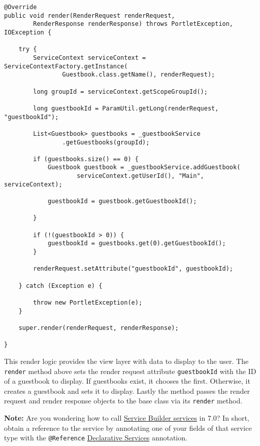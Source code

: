 \begin{verbatim}
@Override
public void render(RenderRequest renderRequest,
        RenderResponse renderResponse) throws PortletException, IOException {

    try {
        ServiceContext serviceContext = ServiceContextFactory.getInstance(
                Guestbook.class.getName(), renderRequest);

        long groupId = serviceContext.getScopeGroupId();

        long guestbookId = ParamUtil.getLong(renderRequest, "guestbookId");

        List<Guestbook> guestbooks = _guestbookService
                .getGuestbooks(groupId);

        if (guestbooks.size() == 0) {
            Guestbook guestbook = _guestbookService.addGuestbook(
                    serviceContext.getUserId(), "Main", serviceContext);

            guestbookId = guestbook.getGuestbookId();

        }

        if (!(guestbookId > 0)) {
            guestbookId = guestbooks.get(0).getGuestbookId();
        }

        renderRequest.setAttribute("guestbookId", guestbookId);

    } catch (Exception e) {

        throw new PortletException(e);
    }

    super.render(renderRequest, renderResponse);

}
\end{verbatim}

This render logic provides the view layer with data to display to the
user. The \texttt{render} method above sets the render request attribute
\texttt{guestbookId} with the ID of a guestbook to display. If
guestbooks exist, it chooses the first. Otherwise, it creates a
guestbook and sets it to display. Lastly the method passes the render
request and render response objects to the base class via its
\texttt{render} method.

\noindent\hrulefill

\textbf{Note:} Are you wondering how to call
\href{/docs/7-2/appdev/-/knowledge_base/a/service-builder}{Service
Builder services} in 7.0? In short, obtain a reference to the service by
annotating one of your fields of that service type with the
\texttt{@Reference}
\href{/docs/7-2/frameworks/-/knowledge_base/f/declarative-services}{Declarative
Services} annotation.

